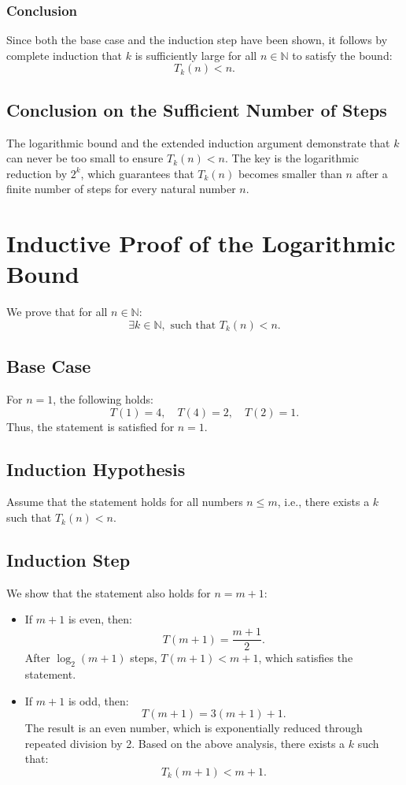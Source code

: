 \documentclass[a4paper,12pt]{article}
\begin{document}
\subsubsection{Conclusion}
Since both the base case and the induction step have been shown, it follows by complete induction that \( k \) is sufficiently large for all \( n \in \mathbb{N} \) to satisfy the bound:
\[
T_k(n) < n.
\]

\subsection{Conclusion on the Sufficient Number of Steps}
The logarithmic bound and the extended induction argument demonstrate that \( k \) can never be too small to ensure \( T_k(n) < n \). The key is the logarithmic reduction by \( 2^k \), which guarantees that \( T_k(n) \) becomes smaller than \( n \) after a finite number of steps for every natural number \( n \).

\section{Inductive Proof of the Logarithmic Bound}
We prove that for all \( n \in \mathbb{N} \):
\[
\exists k \in \mathbb{N}, \text{ such that } T_k(n) < n.
\]

\subsection{Base Case}
For \( n = 1 \), the following holds:
\[
T(1) = 4, \quad T(4) = 2, \quad T(2) = 1.
\]
Thus, the statement is satisfied for \( n = 1 \).

\subsection{Induction Hypothesis}
Assume that the statement holds for all numbers \( n \leq m \), i.e., there exists a \( k \) such that \( T_k(n) < n \).

\subsection{Induction Step}
We show that the statement also holds for \( n = m + 1 \):
\begin{itemize}
    \item If \( m + 1 \) is even, then:
    \[
    T(m + 1) = \frac{m + 1}{2}.
    \]
    After \( \log_2(m + 1) \) steps, \( T(m + 1) < m + 1 \), which satisfies the statement.
    \item If \( m + 1 \) is odd, then:
    \[
    T(m + 1) = 3(m + 1) + 1.
    \]
    The result is an even number, which is exponentially reduced through repeated division by 2. Based on the above analysis, there exists a \( k \) such that:
    \[
    T_k(m + 1) < m + 1.
    \]
\end{itemize}
\end{document}
